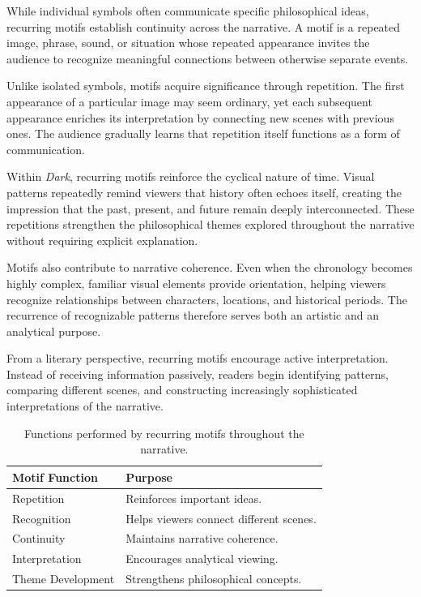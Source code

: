 \documentclass[12pt,oneside,openany]{book}
\begin{document}
While individual symbols often communicate specific philosophical ideas,
recurring motifs establish continuity across the narrative. A motif is a
repeated image, phrase, sound, or situation whose repeated appearance invites
the audience to recognize meaningful connections between otherwise separate
events.

Unlike isolated symbols, motifs acquire significance through repetition. The
first appearance of a particular image may seem ordinary, yet each subsequent
appearance enriches its interpretation by connecting new scenes with previous
ones. The audience gradually learns that repetition itself functions as a form
of communication.

Within \textit{Dark}, recurring motifs reinforce the cyclical nature of time.
Visual patterns repeatedly remind viewers that history often echoes itself,
creating the impression that the past, present, and future remain deeply
interconnected. These repetitions strengthen the philosophical themes explored
throughout the narrative without requiring explicit explanation.

Motifs also contribute to narrative coherence. Even when the chronology becomes
highly complex, familiar visual elements provide orientation, helping viewers
recognize relationships between characters, locations, and historical periods.
The recurrence of recognizable patterns therefore serves both an artistic and
an analytical purpose.

From a literary perspective, recurring motifs encourage active interpretation.
Instead of receiving information passively, readers begin identifying patterns,
comparing different scenes, and constructing increasingly sophisticated
interpretations of the narrative.

\begin{table}[H]
\centering
\begin{tabular}{|p{4.2cm}|p{7.8cm}|}
\hline
\textbf{Motif Function} & \textbf{Purpose}\\
\hline
Repetition & Reinforces important ideas.\\
\hline
Recognition & Helps viewers connect different scenes.\\
\hline
Continuity & Maintains narrative coherence.\\
\hline
Interpretation & Encourages analytical viewing.\\
\hline
Theme Development & Strengthens philosophical concepts.\\
\hline
\end{tabular}
\caption{Functions performed by recurring motifs throughout the narrative.}
\end{table}
\end{document}
